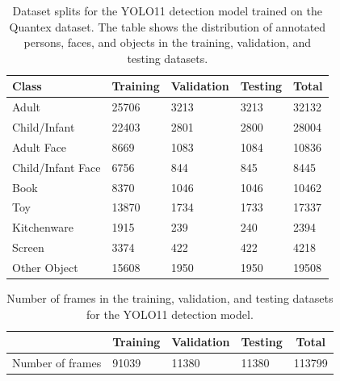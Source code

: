 \documentclass[
  man,floatsintext]{apa6}
\begin{document}
\begin{table}[tbp]

\begin{center}
\begin{threeparttable}

\caption{\label{tab:det-class-distribution}Dataset splits for the YOLO11 detection model trained on the Quantex dataset. The table shows the distribution of annotated persons, faces, and objects in the training, validation, and testing datasets.}

\begin{tabular}{lllll}
\toprule
Class & \multicolumn{1}{c}{Training} & \multicolumn{1}{c}{Validation} & \multicolumn{1}{c}{Testing} & \multicolumn{1}{c}{Total}\\
\midrule
Adult & 25706 & 3213 & 3213 & 32132\\
Child/Infant & 22403 & 2801 & 2800 & 28004\\
Adult Face & 8669 & 1083 & 1084 & 10836\\
Child/Infant Face & 6756 & 844 & 845 & 8445\\
Book & 8370 & 1046 & 1046 & 10462\\
Toy & 13870 & 1734 & 1733 & 17337\\
Kitchenware & 1915 & 239 & 240 & 2394\\
Screen & 3374 & 422 & 422 & 4218\\
Other Object & 15608 & 1950 & 1950 & 19508\\
\bottomrule
\end{tabular}

\end{threeparttable}
\end{center}

\end{table}

\begin{table}[tbp]

\begin{center}
\begin{threeparttable}

\caption{\label{tab:det-dataset-splits}Number of frames in the training, validation, and testing datasets for the YOLO11 detection model.}

\begin{tabular}{lllll}
\toprule
 & \multicolumn{1}{c}{Training} & \multicolumn{1}{c}{Validation} & \multicolumn{1}{c}{Testing} & \multicolumn{1}{c}{Total}\\
\midrule
Number of frames & 91039 & 11380 & 11380 & 113799\\
\bottomrule
\end{tabular}

\end{threeparttable}
\end{center}

\end{table}
\end{document}
